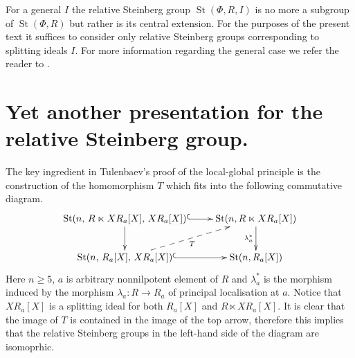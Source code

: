 \documentclass[11pt]{amsart}
\theoremstyle{plain} \declaretheorem[name=Theorem, Refname={Theorem,Theorems}]{tm} \Crefname{tm}{Theorem}{Theorems}
\numberwithin{equation}{section}
\theoremstyle{definition} \newtheorem{df}[lm]{Definition} \Crefname{df}{Definition}{Definitions}
\theoremstyle{remark} \newtheorem{rk}[lm]{Remark} \Crefname{rk}{Remark}{Remarks}
\newcommand{\St}{\mathop{\mathrm{St}}\nolimits}
\begin{document}
For a general $I$ the relative Steinberg group $\St(\Phi, R, I)$ is no more a subgroup of $\St(\Phi, R)$ but rather is its central extension.
For the purposes of the present text it suffices to consider only relative Steinberg groups corresponding to splitting ideals $I$.
For more information regarding the general case we refer the reader to \cite[Section~3]{SCh}.

\section{Yet another presentation for the relative Steinberg group.} \label{sec:yap}
The key ingredient in Tulenbaev's proof of the local-global principle is the construction of the homomorphism $T$ which fits into the following commutative diagram.
\begin{equation} \xymatrix{\St(n,\,R\ltimes XR_a[X],\,XR_a[X]) \ar@{^{(}->}[r] \ar[d] & \St(n, R \ltimes XR_a[X]) \ar[d]_-{\lambda_a^*} \\
             \St(n,\,R_a[X],\,XR_a[X]) \ar@{-->}[ru]_-{T} \ar@{^{(}->}[r] & \St(n, R_a[X])} \label{eq:diagram} \end{equation}
Here $n\geq5$, $a$ is arbitrary nonnilpotent element of $R$ and $\lambda_a^*$ is the morphism induced by the morphism $\lambda_a\colon R \to R_a$ of principal localisation at $a$.
Notice that $XR_a[X]$ is a splitting ideal for both $R_a[X]$ and $R \ltimes XR_a[X]$.
It is clear that the image of $T$ is contained in the image of the top arrow, therefore this implies that the relative Steinberg groups in the left-hand side of the diagram are isomoprhic.

\end{document}
